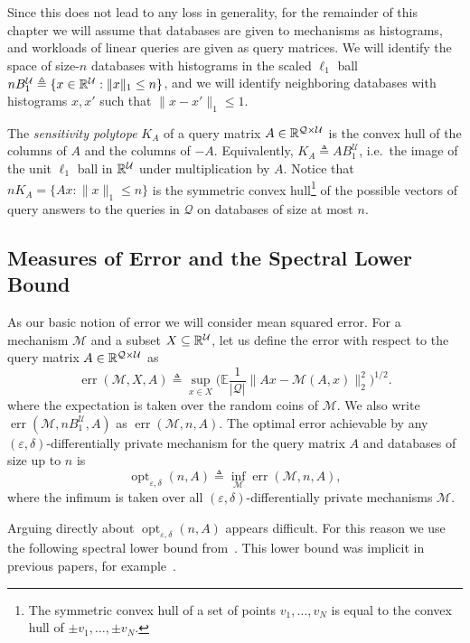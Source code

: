 \documentclass{article}
\newcommand{\mech}{\mathcal{M}}
\newcommand{\eps}{\varepsilon}
\newcommand{\E}{\mathbb{E}}
\newcommand{\univ}{U}
\DeclareMathOperator{\err}{err}
\DeclareMathOperator{\opt}{opt}
\renewcommand{\univ}{\mathcal{U}}
\newcommand{\quer}{\mathcal{Q}}
\begin{document}
Since this does not lead to any loss in generality, for the remainder
of this chapter we will assume that databases are given to mechanisms
as histograms, and workloads of linear queries are given as query
matrices. We will identify the space of size-$n$ databases with
histograms in the scaled $\ell_1$ ball $nB_1^\univ \triangleq \{x\in
\R^\univ: \|x\|_1 \leq n\}$, and we will identify neighboring
databases with histograms $x,x'$ such that $\|x-x'\|_1 \leq 1$. 


The \emph{sensitivity polytope} $K_A$ of a query matrix $A \in
\R^{\quer\times \univ}$ is the convex hull of the columns of $A$ and
the columns of $-A$. Equivalently, $K_A \triangleq AB_1^\univ$,
i.e.~the image of the unit $\ell_1$ ball in $\R^\univ$ under
multiplication by $A$. Notice that $nK_A = \{Ax: \|x\|_1 \leq n\}$ is
the symmetric convex hull\footnote{The symmetric convex hull of a set
  of points $v_1,\ldots,v_N$ is equal to the convex hull of $\pm v_1,
  \ldots, \pm v_N$.} of the possible vectors of query answers to the
queries in $\quer$ on databases of size at most $n$.


\subsection{Measures of Error and the Spectral Lower Bound}

As our basic notion of error we will consider mean squared error.
For a mechanism $\mech$ and a subset $X\subseteq \R^\univ$, let us
define the error with respect to the query matrix $A \in
\R^{\quer\times \univ}$ as
\begin{equation*}
  \err(\mech, X, A) \triangleq \sup_{x \in X} \Biggl(\E\frac{1}{|\quer|} \|Ax -
    \mech(A, x)\|_2^2\Biggr)^{1/2}.
\end{equation*}
where the expectation is taken over the random coins of
$\mech$.
We also write $\err(\mech,nB_1^\univ, A)$ as $\err(\mech, n, A)$. The optimal
error achievable by any $(\eps, \delta)$-differentially private
mechanism for the query matrix $A$ and databases of size up to $n$ is
\begin{equation*}
  \opt_{\eps, \delta}(n, A) \triangleq \inf_{\mech} \err(\mech, n, A),
\end{equation*}
where the infimum is taken over all $(\eps, \delta)$-differentially
private mechanisms $\mech$.

Arguing directly about $\opt_{\eps, \delta}(n, A)$ appears
difficult. For this reason we use the following spectral lower bound
from~\cite{NTZ}. This lower bound was implicit in previous papers, for example~\cite{shiva2010}.
\end{document}

